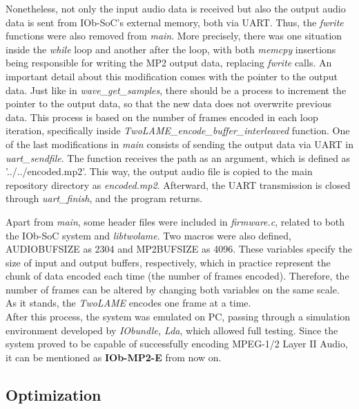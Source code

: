 Nonetheless, not only the input audio data is received but also the output audio data is sent from IOb-SoC's external memory, both via UART. Thus, the \textit{fwrite} functions were also removed from \textit{main}.
More precisely, there was one situation inside the \textit{while} loop and another after the loop, with both \textit{memcpy} insertions being responsible for writing the MP2 output data, replacing \textit{fwrite} calls. An important detail about this modification comes with the pointer to the output data. Just like in \textit{wave\_get\_samples}, there should be a process to increment the pointer to the output data, so that the new data does not overwrite previous data. This process is based on the number of frames encoded in each loop iteration, specifically inside \textit{\textit{TwoLAME}\_encode\_buffer\_interleaved} function.
One of the last modifications in \textit{main} consists of sending the output data via UART in \textit{uart\_sendfile}. The function receives the path as an argument, which is defined as ’../../encoded.mp2’. This way, the output audio file is copied to the main repository directory as \textit{encoded.mp2}.
Afterward, the UART transmission is closed through \textit{uart\_finish}, and the program returns.

Apart from \textit{main}, some header files were included in \textit{firmware.c}, related to both the IOb-SoC system and \textit{libtwolame}. Two macros were also defined, AUDIOBUFSIZE as 2304 and MP2BUFSIZE as 4096. These variables specify the size of input and output buffers, respectively, which in practice represent the chunk of data encoded each time (the number of frames encoded). Therefore, the number of frames can be altered by changing both variables on the same scale. As it stands, the \textit{TwoLAME} encodes one frame at a time.\\
After this process, the system was emulated on PC, passing through a simulation environment developed by \textit{IObundle, Lda}, which allowed full testing. Since the system proved to be capable of successfully encoding MPEG-1/2 Layer II Audio, it can be mentioned as \textbf{IOb-MP2-E} from now on. 

\subsection{Optimization}

